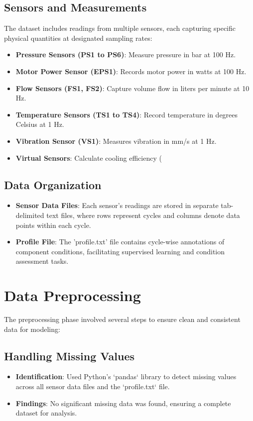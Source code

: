 \documentclass[sigconf]{acmart}
\begin{document}
\subsection{Sensors and Measurements} 
The dataset includes readings from multiple sensors, each capturing specific physical quantities at designated sampling rates:
\begin{itemize} 
    \item \textbf{Pressure Sensors (PS1 to PS6)}: Measure pressure in bar at 100 Hz.
    \item \textbf{Motor Power Sensor (EPS1)}: Records motor power in watts at 100 Hz.
    \item \textbf{Flow Sensors (FS1, FS2)}: Capture volume flow in liters per minute at 10 Hz.
    \item \textbf{Temperature Sensors (TS1 to TS4)}: Record temperature in degrees Celsius at 1 Hz.
    \item \textbf{Vibration Sensor (VS1)}: Measures vibration in mm/s at 1 Hz.
    \item \textbf{Virtual Sensors}: Calculate cooling efficiency (%
\end{itemize}

\subsection{Data Organization} 
\begin{itemize} 
    \item \textbf{Sensor Data Files}: Each sensor's readings are stored in separate tab-delimited text files, where rows represent cycles and columns denote data points within each cycle.
    \item \textbf{Profile File}: The 'profile.txt' file contains cycle-wise annotations of component conditions, facilitating supervised learning and condition assessment tasks.
\end{itemize}

\section{Data Preprocessing} 
The preprocessing phase involved several steps to ensure clean and consistent data for modeling:

\subsection{Handling Missing Values} 
\begin{itemize} 
    \item \textbf{Identification}: Used Python's `pandas` library to detect missing values across all sensor data files and the `profile.txt` file.
    \item \textbf{Findings}: No significant missing data was found, ensuring a complete dataset for analysis.
\end{itemize}
\end{document}
